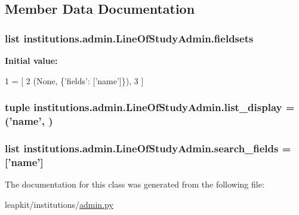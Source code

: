 \subsection{Member Data Documentation}
\hypertarget{classinstitutions_1_1admin_1_1_line_of_study_admin_ae095c566d0a9659d1f1e219b85338868}{
\subsubsection[{fieldsets}]{\setlength{\rightskip}{0pt plus 5cm}list institutions.\-admin.\-Line\-Of\-Study\-Admin.\-fieldsets\hspace{0.3cm}{\ttfamily [static]}}}\label{classinstitutions_1_1admin_1_1_line_of_study_admin_ae095c566d0a9659d1f1e219b85338868}
{\bfseries Initial value\-:}
\begin{DoxyCode}
1 = [
2         (\textcolor{keywordtype}{None}, \{\textcolor{stringliteral}{'fields'}: [\textcolor{stringliteral}{'name'}]\}),
3     ]
\end{DoxyCode}
\hypertarget{classinstitutions_1_1admin_1_1_line_of_study_admin_a4752ddfdf339d1f16aaf054f1b86bd89}{
\subsubsection[{list\-\_\-display}]{\setlength{\rightskip}{0pt plus 5cm}tuple institutions.\-admin.\-Line\-Of\-Study\-Admin.\-list\-\_\-display = ('name', )\hspace{0.3cm}{\ttfamily [static]}}}\label{classinstitutions_1_1admin_1_1_line_of_study_admin_a4752ddfdf339d1f16aaf054f1b86bd89}
\hypertarget{classinstitutions_1_1admin_1_1_line_of_study_admin_a462d2869dfbdf18d70be799114a3835b}{
\subsubsection[{search\-\_\-fields}]{\setlength{\rightskip}{0pt plus 5cm}list institutions.\-admin.\-Line\-Of\-Study\-Admin.\-search\-\_\-fields = \mbox{[}'name'\mbox{]}\hspace{0.3cm}{\ttfamily [static]}}}\label{classinstitutions_1_1admin_1_1_line_of_study_admin_a462d2869dfbdf18d70be799114a3835b}


The documentation for this class was generated from the following file\-:\begin{DoxyCompactItemize}
\item 
leapkit/institutions/\hyperlink{institutions_2admin_8py}{admin.\-py}\end{DoxyCompactItemize}

